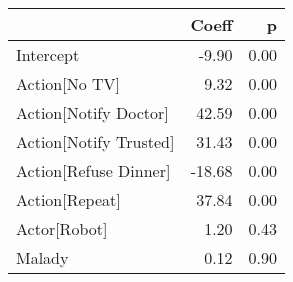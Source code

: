 \begin{tabular}{lrr}
\toprule
{} &  Coeff &    p \\
\midrule
Intercept                &  -9.90 & 0.00 \\
Action[No TV]          &   9.32 & 0.00 \\
Action[Notify Doctor]  &  42.59 & 0.00 \\
Action[Notify Trusted] &  31.43 & 0.00 \\
Action[Refuse Dinner]  & -18.68 & 0.00 \\
Action[Repeat]         &  37.84 & 0.00 \\
Actor[Robot]           &   1.20 & 0.43 \\
Malady                   &   0.12 & 0.90 \\
\bottomrule
\end{tabular}

